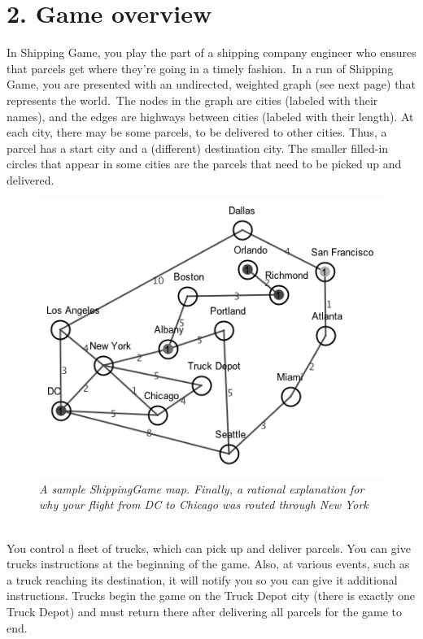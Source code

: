 \documentclass[11pt]{article}
\begin{document}
\section{2. Game overview}
In Shipping Game, you play the part of a shipping company engineer who ensures that parcels get where they're going in a timely fashion.\ In a run of Shipping Game, you are presented with an undirected, weighted graph (see next page) that represents the world.\ The nodes in the graph are cities (labeled with their names), and the edges are highways between cities (labeled with their length). At each city, there may be some parcels, to be delivered to other cities. Thus, a parcel has a start city and a (different) destination city.
The smaller filled-in circles that appear in some cities are the parcels that need to be picked up and delivered.\\
\begin{figure}[h]
\centerline{\includegraphics[scale=0.75]{map1.png}} 
\caption{\em{A sample ShippingGame map. Finally, a rational explanation for why your flight from DC to Chicago was routed through New York}}
\end{figure}\\
You control a fleet of trucks, which can pick up and deliver parcels. You can give trucks instructions at the beginning of the game.
Also, at various events, such as a truck reaching its destination, it will notify you so you can give it additional instructions.
Trucks begin the game on the Truck Depot city (there is exactly one Truck Depot) and must return there after delivering all parcels for the game to end.
\end{document}
